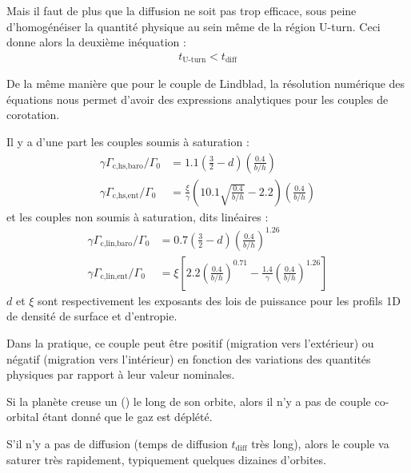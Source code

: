 Mais il faut de plus que la diffusion ne soit pas trop efficace, sous peine d'homogénéiser la quantité physique au sein même de la région \og U-turn\fg. Ceci donne alors la deuxième inéquation : 
\begin{align}
t_\text{U-turn} < t_\text{diff}
\end{align}

\bigskip

De la même manière que pour le couple de Lindblad, la résolution numérique des équations nous permet d'avoir des expressions analytiques pour les couples de corotation. 

Il y a d'une part les couples soumis à saturation \citep[eq. (45)]{paardekooper2010torque} :
\begin{subequations}
\begin{align}
\gamma \Gamma_\text{c,hs,baro}/\Gamma_0 &= 1.1\left( \frac{3}{2} - d\right)\left(\frac{0.4}{b/h}\right)\\
\gamma \Gamma_\text{c,hs,ent}/\Gamma_0 &= \frac{\xi}{\gamma}\left(10.1\sqrt{\frac{0.4}{b/h}} - 2.2\right)\left(\frac{0.4}{b/h}\right)
\end{align}
\end{subequations}
et les couples non soumis à saturation, dits linéaires \citep[eq. (17)]{paardekooper2010torque} :
\begin{subequations}
\begin{align}
\gamma \Gamma_\text{c,lin,baro}/\Gamma_0 &= 0.7\left( \frac{3}{2} - d\right)\left(\frac{0.4}{b/h}\right)^{1.26}\\
\gamma \Gamma_\text{c,lin,ent}/\Gamma_0 &= \xi\left[2.2\left(\frac{0.4}{b/h}\right)^{0.71} - \frac{1.4}{\gamma}\left(\frac{0.4}{b/h}\right)^{1.26}\right]
\end{align}
\end{subequations}
$d$ et $\xi$ sont respectivement les exposants des lois de puissance pour les profils 1D de densité de surface et d'entropie.

\bigskip

Dans la pratique, ce couple peut être positif (migration vers l'extérieur) ou négatif (migration vers l'intérieur) en fonction des variations des quantités physiques par rapport à leur valeur nominales.

\begin{remarque}
Si la planète creuse un  () le long de son orbite, alors il n'y a pas de couple co-orbital étant donné que le gaz est déplété.

S'il n'y a pas de diffusion (temps de diffusion $t_\text{diff}$ très long), alors le couple va saturer très rapidement, typiquement quelques dizaines d'orbites.
\end{remarque}

